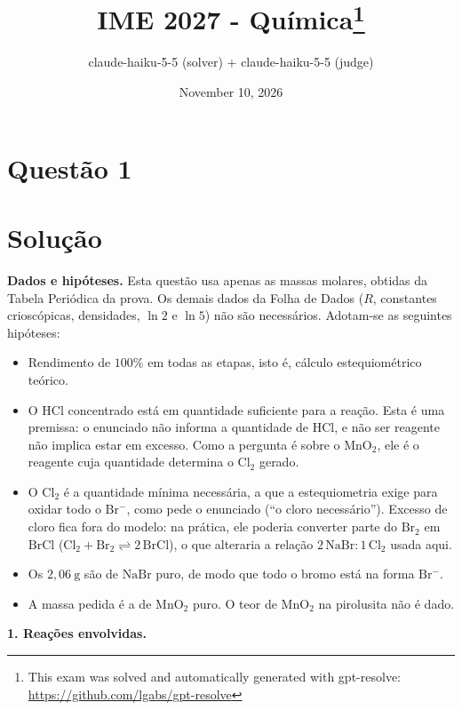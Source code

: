 \documentclass{article}%
\title{IME 2027 - Química\thanks{This exam was solved and automatically generated with gpt-resolve: \url{https://github.com/lgabs/gpt-resolve}}}%
\author{claude{-}haiku{-}5{-}5 (solver) + claude{-}haiku{-}5{-}5 (judge)}%
\date{November 10, 2026}%
\begin{document}
%
\normalsize%
\maketitle%
\section*{Questão 1}

\section*{Solução}

\textbf{Dados e hipóteses.} Esta questão usa apenas as massas molares, obtidas da Tabela Periódica da prova. Os demais dados da Folha de Dados ($R$, constantes crioscópicas, densidades, $\ln 2$ e $\ln 5$) não são necessários. Adotam-se as seguintes hipóteses:
\begin{itemize}
\item[(i)] Rendimento de $100\%$ em todas as etapas, isto é, cálculo estequiométrico teórico.
\item[(ii)] O $\mathrm{HCl}$ concentrado está em quantidade suficiente para a reação. Esta é uma premissa: o enunciado não informa a quantidade de $\mathrm{HCl}$, e não ser reagente não implica estar em excesso. Como a pergunta é sobre o $\mathrm{MnO_2}$, ele é o reagente cuja quantidade determina o $\mathrm{Cl_2}$ gerado.
\item[(iii)] O $\mathrm{Cl_2}$ é a quantidade mínima necessária, a que a estequiometria exige para oxidar todo o $\mathrm{Br^{-}}$, como pede o enunciado (``o cloro necessário''). Excesso de cloro fica fora do modelo: na prática, ele poderia converter parte do $\mathrm{Br_2}$ em $\mathrm{BrCl}$ ($\mathrm{Cl_2 + Br_2 \rightleftharpoons 2\,BrCl}$), o que alteraria a relação $2\,\mathrm{NaBr} : 1\,\mathrm{Cl_2}$ usada aqui.
\item[(iv)] Os $2{,}06\ \mathrm{g}$ são de $\mathrm{NaBr}$ puro, de modo que todo o bromo está na forma $\mathrm{Br^{-}}$.
\item[(v)] A massa pedida é a de $\mathrm{MnO_2}$ puro. O teor de $\mathrm{MnO_2}$ na pirolusita não é dado.
\end{itemize}

\textbf{1. Reações envolvidas.}
\end{document}
